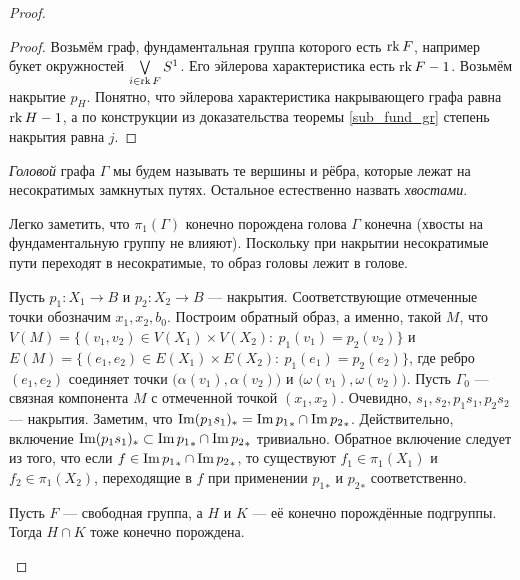 \documentclass[10pt,a4paper]{article}%
\begin{document}
\begin{proof}
\begin{proof} Возьмём граф, фундаментальная группа которого есть $\operatorname{rk} F$,
например букет окружностей $\bigvee\limits_{i\in\operatorname{rk} F}S^1$. Его
эйлерова характеристика есть $\operatorname{rk} F-1$. Возьмём накрытие $p_H$.
Понятно, что эйлерова характеристика накрывающего графа равна $\operatorname{rk}
H-1$, а по конструкции из доказательства теоремы \ref{sub_fund_gr}
степень накрытия равна $j$.\end{proof}

{\em Головой} графа $\Gamma$ мы будем называть
те вершины и рёбра, которые лежат на несократимых замкнутых путях.
Остальное естественно назвать {\em хвостами}.

Легко заметить, что $\pi_1(\Gamma)$ конечно порождена \ifif голова
$\Gamma$ конечна (хвосты на фундаментальную группу не влияют).
Поскольку при накрытии несократимые пути переходят в несократимые,
то образ головы лежит в голове.

\vskip-12pt  \hangindent=-24mm 
Пусть $p_1:X_1\to B$ и $p_2:X_2\to B$ --- накрытия.
Соответствующие отмеченные точки обозначим $x_1,x_2,b_0$. Построим
обратный образ, а именно, такой $M$, что $V(M)=\{(v_1,v_2)\in
V(X_1)\times V(X_2):~p_1(v_1)=p_2(v_2)\}$ и $E(M)=\{(e_1,e_2)\in
E(X_1)\times E(X_2):~p_1(e_1)=p_2(e_2)\}$, где ребро $(e_1,e_2)$
соединяет точки
$\big(\alpha(v_1),\alpha(v_2)\big)$\break\vskip-18pt
\vskip-5pt\noindent \hangindent=24mm
 и $\big(\omega(v_1),\omega(v_2)\big)$. Пусть
$\Gamma_0$
--- связная компонента $M$ с отмеченной точкой $(x_1,x_2)$.
Очевидно,  $s_1,s_2,p_1s_1,p_2s_2$ --- накрытия. Заметим, что
$\operatorname{Im}(p_1s_1)_*=\operatorname{Im}{p_1}_*\cap\operatorname{Im}{p_2}_*$. Действительно,
включение $\operatorname{Im}(p_1s_1)_*\subset\operatorname{Im}{p_1}_*\cap\operatorname{Im}{p_2}_*$
тривиально. Обратное включение следует из того, что если
$f\in\operatorname{Im}{p_1}_*\cap\operatorname{Im}{p_2}_*$, то существуют
$f_1\in\pi_1(X_1)$ и $f_2\in\pi_1(X_2)$, переходящие в $f$ при
применении ${p_1}_*$ и ${p_2}_*$ соответственно.

\begin{theorem}[Хаусон] Пусть
$F$ --- свободная группа, а $H$ и $K$ --- её конечно порождённые
подгруппы. Тогда $H\cap K$ тоже конечно порождена.
\end{theorem}


\end{proof}
\end{document}
